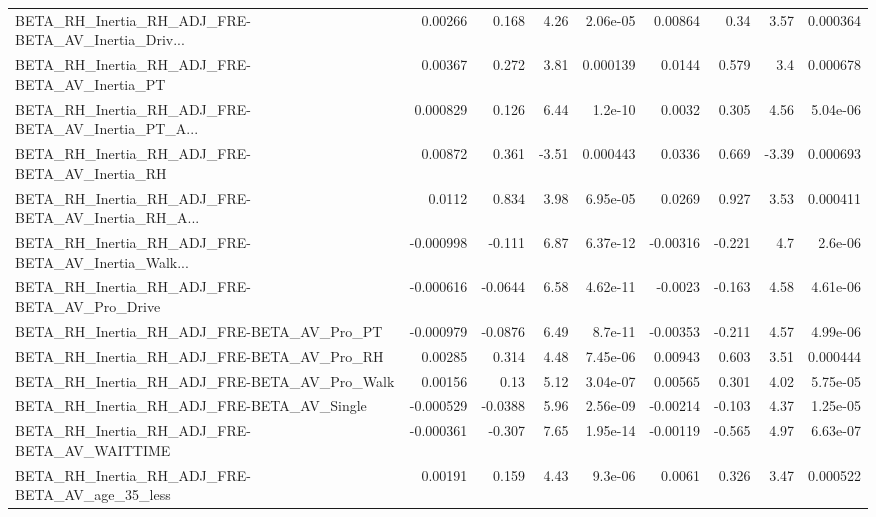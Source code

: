 \begin{tabular}{lrrrrrrrr}
BETA\_RH\_Inertia\_RH\_ADJ\_FRE-BETA\_AV\_Inertia\_Driv... &     0.00266 &        0.168 &     4.26 & 2.06e-05 &    0.00864 &        0.34 &         3.57 &      0.000364 \\
BETA\_RH\_Inertia\_RH\_ADJ\_FRE-BETA\_AV\_Inertia\_PT      &     0.00367 &        0.272 &     3.81 & 0.000139 &     0.0144 &       0.579 &          3.4 &      0.000678 \\
BETA\_RH\_Inertia\_RH\_ADJ\_FRE-BETA\_AV\_Inertia\_PT\_A... &    0.000829 &        0.126 &     6.44 &  1.2e-10 &     0.0032 &       0.305 &         4.56 &      5.04e-06 \\
BETA\_RH\_Inertia\_RH\_ADJ\_FRE-BETA\_AV\_Inertia\_RH      &     0.00872 &        0.361 &    -3.51 & 0.000443 &     0.0336 &       0.669 &        -3.39 &      0.000693 \\
BETA\_RH\_Inertia\_RH\_ADJ\_FRE-BETA\_AV\_Inertia\_RH\_A... &      0.0112 &        0.834 &     3.98 & 6.95e-05 &     0.0269 &       0.927 &         3.53 &      0.000411 \\
BETA\_RH\_Inertia\_RH\_ADJ\_FRE-BETA\_AV\_Inertia\_Walk... &   -0.000998 &       -0.111 &     6.87 & 6.37e-12 &   -0.00316 &      -0.221 &          4.7 &       2.6e-06 \\
BETA\_RH\_Inertia\_RH\_ADJ\_FRE-BETA\_AV\_Pro\_Drive       &   -0.000616 &      -0.0644 &     6.58 & 4.62e-11 &    -0.0023 &      -0.163 &         4.58 &      4.61e-06 \\
BETA\_RH\_Inertia\_RH\_ADJ\_FRE-BETA\_AV\_Pro\_PT          &   -0.000979 &      -0.0876 &     6.49 &  8.7e-11 &   -0.00353 &      -0.211 &         4.57 &      4.99e-06 \\
BETA\_RH\_Inertia\_RH\_ADJ\_FRE-BETA\_AV\_Pro\_RH          &     0.00285 &        0.314 &     4.48 & 7.45e-06 &    0.00943 &       0.603 &         3.51 &      0.000444 \\
BETA\_RH\_Inertia\_RH\_ADJ\_FRE-BETA\_AV\_Pro\_Walk        &     0.00156 &         0.13 &     5.12 & 3.04e-07 &    0.00565 &       0.301 &         4.02 &      5.75e-05 \\
BETA\_RH\_Inertia\_RH\_ADJ\_FRE-BETA\_AV\_Single          &   -0.000529 &      -0.0388 &     5.96 & 2.56e-09 &   -0.00214 &      -0.103 &         4.37 &      1.25e-05 \\
BETA\_RH\_Inertia\_RH\_ADJ\_FRE-BETA\_AV\_WAITTIME        &   -0.000361 &       -0.307 &     7.65 & 1.95e-14 &   -0.00119 &      -0.565 &         4.97 &      6.63e-07 \\
BETA\_RH\_Inertia\_RH\_ADJ\_FRE-BETA\_AV\_age\_35\_less     &     0.00191 &        0.159 &     4.43 &  9.3e-06 &     0.0061 &       0.326 &         3.47 &      0.000522 \\

\end{tabular}
